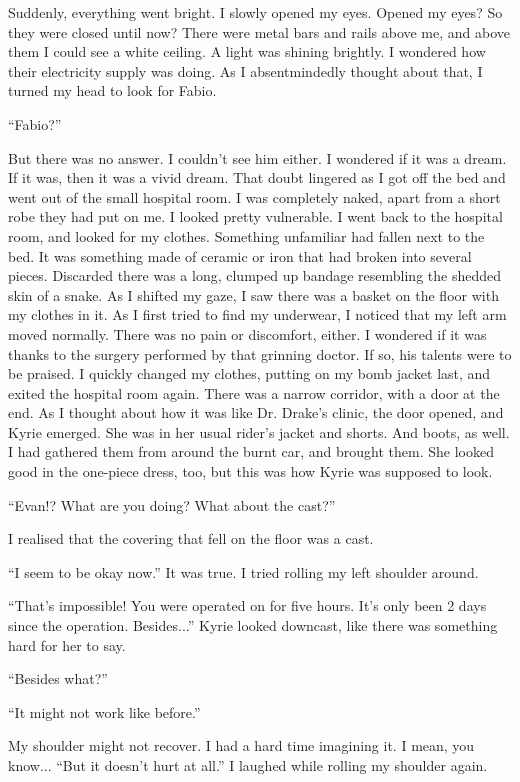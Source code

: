 \documentclass[oneside]{book}
\begin{document}
Suddenly, everything went bright. I slowly opened my eyes. Opened my eyes? So they were closed until now? There were metal bars and rails above me, and above them I could see a white ceiling. A light was shining brightly. I wondered how their electricity supply was doing. As I absentmindedly thought about that, I turned my head to look for Fabio.

“Fabio?”

But there was no answer. I couldn’t see him either. I wondered if it was a dream. If it was, then it was a vivid dream. That doubt lingered as I got off the bed and went out of the small hospital room. I was completely naked, apart from a short robe they had put on me. I looked pretty vulnerable. I went back to the hospital room, and looked for my clothes. Something unfamiliar had fallen next to the bed. It was something made of ceramic or iron that had broken into several pieces. Discarded there was a long, clumped up bandage resembling the shedded skin of a snake. As I shifted my gaze, I saw there was a basket on the floor with my clothes in it. As I first tried to find my underwear, I noticed that my left arm moved normally. There was no pain or discomfort, either. I wondered if it was thanks to the surgery performed by that grinning doctor. If so, his talents were to be praised. I quickly changed my clothes, putting on my bomb jacket last, and exited the hospital room again. There was a narrow corridor, with a door at the end. As I thought about how it was like Dr. Drake’s clinic, the door opened, and Kyrie emerged. She was in her usual rider’s jacket and shorts. And boots, as well. I had gathered them from around the burnt car, and brought them. She looked good in the one-piece dress, too, but this was how Kyrie was supposed to look.

“Evan!? What are you doing? What about the cast?”

I realised that the covering that fell on the floor was a cast.

“I seem to be okay now.” It was true. I tried rolling my left shoulder around.

“That’s impossible! You were operated on for five hours. It’s only been 2 days since the operation. Besides...” Kyrie looked downcast, like there was something hard for her to say.

“Besides what?”

“It might not work like before.”

My shoulder might not recover. I had a hard time imagining it. I mean, you know... “But it doesn’t hurt at all.” I laughed while rolling my shoulder again.
\end{document}
